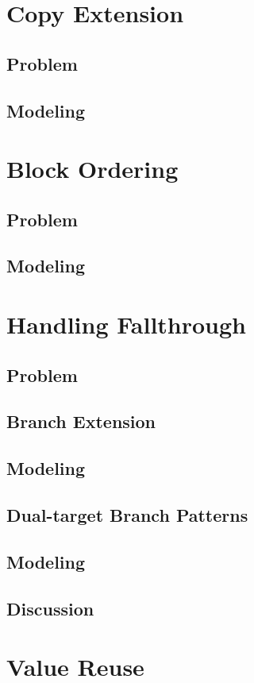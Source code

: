\documentclass[twoside]{kthdiss}
\begin{document}
\chapter{Copy Extension}
\section{Problem}
\section{Modeling}

\chapter{Block Ordering}
\section{Problem}
\section{Modeling}

\chapter{Handling Fallthrough}
\section{Problem}
\section{Branch Extension}
\section{Modeling}
\section{Dual-target Branch Patterns}
\section{Modeling}
\section{Discussion}

\chapter{Value Reuse}
\end{document}
